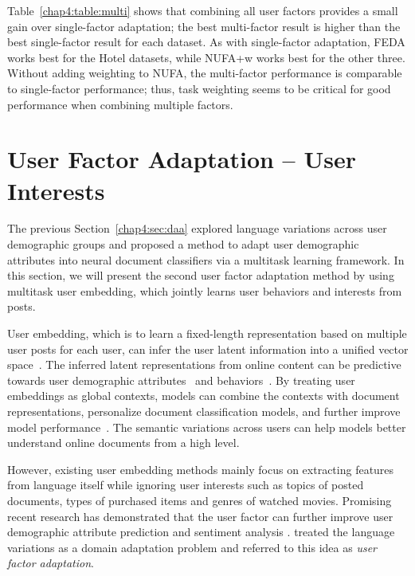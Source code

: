 Table~\ref{chap4:table:multi} shows that combining all user factors
provides a small gain over single-factor adaptation;
the best multi-factor result is higher than the best single-factor result for each dataset.
As with single-factor adaptation, FEDA works best for the Hotel datasets,
while NUFA+w works best for the other three.
Without adding weighting to NUFA, the multi-factor performance is comparable to single-factor performance;
thus, task weighting seems to be critical for good performance when combining multiple factors.


\section{User Factor Adaptation -- User Interests}
\label{chap4:sec:uemb}

The previous Section~\ref{chap4:sec:daa} explored language variations across user demographic groups and proposed a method to adapt user demographic attributes into neural document classifiers via a multitask learning framework.
In this section, we will present the second user factor adaptation method by using multitask user embedding, which jointly learns user behaviors and interests from posts.

User embedding, which is to learn a fixed-length representation based on multiple user posts for each user, can infer the user latent information into a unified vector space~\cite{benton2018learning, pan2019social}.
The inferred latent representations from online content can be predictive towards user demographic attributes~\cite{volkova2015inferring, wang2018cross, farnadi2018user, lynn2020hierarchical} and behaviors~\cite{amir2017quantifying, benton2017multitask, ding2017multi}.
By treating user embeddings as global contexts, models can combine the contexts with document representations, personalize document classification models, and further improve model performance~\cite{tang2015learning, chen2016neural, yang2017overcoming, wu2018improving, zeng2019joint, huang2019deep}.
The semantic variations across users can help models better understand online documents from a high level.

However, existing user embedding methods \cite{amir2016modelling, benton2016learning, xing2017incorporating, pan2019social} mainly focus on extracting features from language itself while ignoring user interests such as topics of posted documents, types of purchased items and genres of watched movies.
Promising recent research has demonstrated that the user factor can further improve user demographic attribute prediction \cite{farnadi2018user} and sentiment analysis \cite{yang2017overcoming}.
\cite{lynn2017human} treated the language variations as a domain adaptation problem and referred to this idea as \textit{user factor adaptation}.

